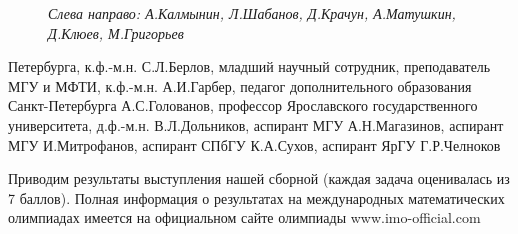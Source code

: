 \documentclass[a4paper,12pt]{article}
\begin{document}
\begin{multicols}{2}
\begin{figure}[H]
        \captionsetup{font=scriptsize,labelformat=empty}
        \caption{\textit{Слева направо: А.Калмынин, Л.Шабанов, Д.Крачун, А.Матушкин, Д.Клюев, М.Григорьев}}
    \end{figure}
    \vspace{-\baselineskip}
    {\par \hspace*{0.2cm}Петербурга, к.ф.-м.н. С.Л.Берлов, младший научный сотрудник, преподаватель МГУ и МФТИ, к.ф.-м.н. А.И.Гарбер, педагог дополнительного образования Санкт-Петербурга А.С.Голованов, профессор Ярославского государственного университета, д.ф.-м.н. В.Л.Дольников, аспирант МГУ А.Н.Магазинов, аспирант МГУ И.Митрофанов, аспирант СПбГУ К.А.Сухов, аспирант ЯрГУ Г.Р.Челноков}
    {\par \hspace*{0.2cm}Приводим результаты выступления нашей сборной (каждая задача оценивалась из 7 баллов). Полная информация о результатах на международных математических олимпиадах имеется на официальном сайте олимпиады www.imo-official.com}
\end{multicols}
\newpage
{} %
\end{document}
